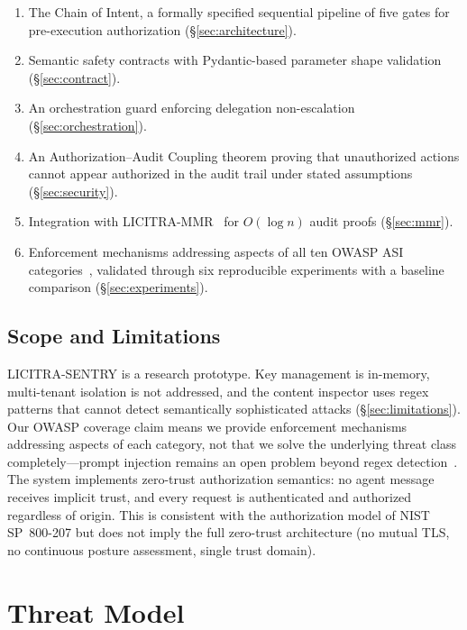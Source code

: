 \documentclass[11pt,a4paper]{article}
\begin{document}
\begin{enumerate}[nosep]
  \item The Chain of Intent, a formally specified sequential pipeline of five gates for
        pre-execution authorization (\S\ref{sec:architecture}).
  \item Semantic safety contracts with Pydantic-based parameter shape validation
        (\S\ref{sec:contract}).
  \item An orchestration guard enforcing delegation non-escalation (\S\ref{sec:orchestration}).
  \item An Authorization--Audit Coupling theorem proving that unauthorized actions cannot
        appear authorized in the audit trail under stated assumptions (\S\ref{sec:security}).
  \item Integration with LICITRA-MMR~\cite{licitrammr} for $O(\log n)$ audit proofs
        (\S\ref{sec:mmr}).
  \item Enforcement mechanisms addressing aspects of all ten OWASP ASI categories~\cite{owasp}, validated
        through six reproducible experiments with a baseline comparison
        (\S\ref{sec:experiments}).
\end{enumerate}

\subsection{Scope and Limitations}

LICITRA-SENTRY is a research prototype. Key management is in-memory, multi-tenant
isolation is not addressed, and the content inspector uses regex patterns that cannot detect
semantically sophisticated attacks (\S\ref{sec:limitations}). Our OWASP coverage claim means
we provide enforcement mechanisms addressing aspects of each category, not that we solve the underlying
threat class completely---prompt injection remains an open problem beyond regex
detection~\cite{owasp}. The system implements zero-trust authorization semantics: no agent
message receives implicit trust, and every request is authenticated and authorized regardless
of origin. This is consistent with the authorization model of NIST SP~800-207 but does not
imply the full zero-trust architecture (no mutual TLS, no continuous posture assessment,
single trust domain).


\section{Threat Model}\label{sec:threat}
\end{document}
